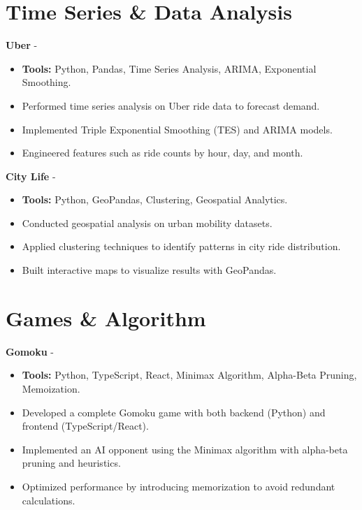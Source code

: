 \documentclass[a4paper,11pt]{article}%
\begin{document}
\section*{Time Series \& Data Analysis}%
%
\noindent \textbf{Uber} - \href{https://github.com/sboof911/Uber}{{}}%
\begin{itemize}[leftmargin=2em,parsep=0pt,topsep=1em]%
\item[] \textbf{Tools:} Python, Pandas, Time Series Analysis, ARIMA, Exponential Smoothing.%
\item Performed time series analysis on Uber ride data to forecast demand.%
\item Implemented Triple Exponential Smoothing (TES) and ARIMA models.%
\item Engineered features such as ride counts by hour, day, and month.%
\end{itemize}%
%
\noindent \textbf{City Life} - \href{https://github.com/sboof911/City-Life}{{}}%
\begin{itemize}[leftmargin=2em,parsep=0pt,topsep=1em]%
\item[] \textbf{Tools:} Python, GeoPandas, Clustering, Geospatial Analytics.%
\item Conducted geospatial analysis on urban mobility datasets.%
\item Applied clustering techniques to identify patterns in city ride distribution.%
\item Built interactive maps to visualize results with GeoPandas.%
\end{itemize}%
%
\section*{Games \& Algorithm}%
%
\noindent \textbf{Gomoku} - \href{https://github.com/sboof911/Gomoku}{{}}%
\begin{itemize}[leftmargin=2em,parsep=0pt,topsep=1em]%
\item[] \textbf{Tools:} Python, TypeScript, React, Minimax Algorithm, Alpha-Beta Pruning, Memoization.%
\item Developed a complete Gomoku game with both backend (Python) and frontend (TypeScript/React).%
\item Implemented an AI opponent using the Minimax algorithm with alpha-beta pruning and heuristics.%
\item Optimized performance by introducing memorization to avoid redundant calculations.%
\end{itemize}%
%
\end{document}
